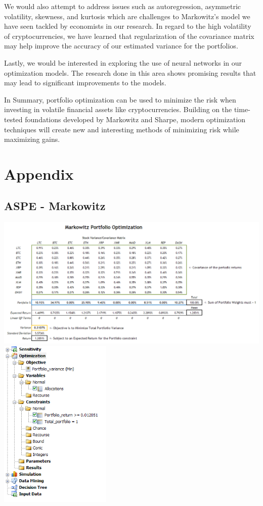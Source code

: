 \documentclass[11pt]{article} %
\begin{document}
We would also attempt to address issues such as autoregression, asymmetric volatility, skewness, and kurtosis which are challenges to Markowitz’s model we have seen tackled by economists in our research. In regard to the high volatility of cryptocurrencies, we have learned that regularization of the covariance matrix may help improve the accuracy of our estimated variance for the portfolios.

Lastly, we would be interested in exploring the use of neural networks in our optimization models. The research done in this area shows promising results that may lead to significant improvements to the models.

In Summary, portfolio optimization can be used to minimize the risk when investing in volatile financial assets like cryptocurrencies. Building on the time-tested foundations developed by Markowitz and Sharpe, modern optimization techniques will create new and interesting methods of minimizing risk while maximizing gains.


\section*{Appendix}

\subsection*{ASPE - Markowitz}

\includegraphics[width=\textwidth]{aspe1}
\includegraphics[width=0.4\textwidth]{aspe2}
\end{document}
